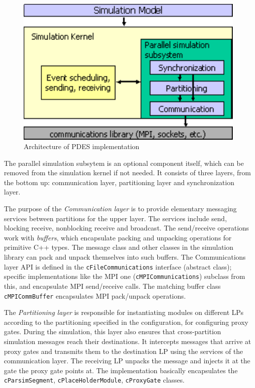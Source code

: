 \begin{figure}[htbp]
  \begin{center}
    \includegraphics{figures/parsim-arch}
    \caption{Architecture of {\opp} PDES implementation}
    \label{fig:parsim-arch}
  \end{center}
\end{figure}

The parallel simulation subsytem is an optional component
itself, which can be removed from the simulation kernel
if not needed. It consists of three layers, from the bottom up:
communication layer, partitioning layer and synchronization layer.

The purpose of the \textit{Communication layer} is to
provide elementary messaging services between partitions for the
upper layer. The services include send, blocking receive,
nonblocking receive and broadcast. The send/receive operations
work with \textit{buffers}, which encapsulate packing and unpacking
operations for primitive C++ types. The message class and
other classes in the simulation library can pack and unpack
themselves into such buffers. The Communications layer API
is defined in the \texttt{cFileCommunications} interface
(abstract class); specific implementations like the MPI
one (\texttt{cMPICommunications}) subclass from this,
and encapsulate MPI send/receive calls. The matching buffer
class \texttt{cMPICommBuffer} encapsulates MPI pack/unpack
operations.

The \textit{Partitioning layer} is responsible for instantiating
modules on different LPs according to the partitioning specified
in the configuration, for configuring proxy gates.
During the simulation, this layer also ensures that cross-partition
simulation messages reach their destinations. It intercepts messages
that arrive at proxy gates and transmits them to the destination LP
using the services of the communication layer. The receiving LP
unpacks the message and injects it at the gate the proxy gate points at.
The implementation basically encapsulates the
\texttt{cParsimSegment}, \texttt{cPlaceHolderModule},
\texttt{cProxyGate} classes.

